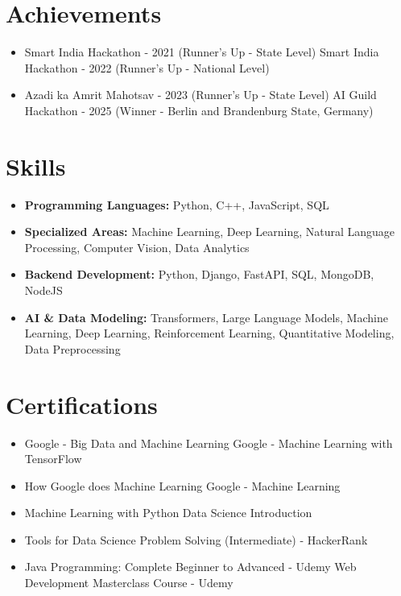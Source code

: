 \documentclass[a4paper,10pt]{article}
\begin{document}
\section*{Achievements}
\begin{itemize}
\item Smart India Hackathon - 2021 (Runner's Up - State Level) \hfill Smart India Hackathon - 2022 (Runner's Up - National Level)
\item Azadi ka Amrit Mahotsav - 2023 (Runner's Up - State Level) \hfill AI Guild Hackathon - 2025 (Winner - Berlin and Brandenburg State, Germany)
\end{itemize}

\section*{Skills}
\begin{itemize}
  \item \textbf{Programming Languages:} Python, C++, JavaScript, SQL
  \item \textbf{Specialized Areas:} Machine Learning, Deep Learning, Natural Language Processing, Computer Vision, Data Analytics
  \item \textbf{Backend Development:} Python, Django, FastAPI, SQL, MongoDB, NodeJS
  \item \textbf{AI \& Data Modeling:} Transformers, Large Language Models, Machine Learning, Deep Learning, Reinforcement Learning, Quantitative Modeling, Data Preprocessing
\end{itemize}

\section*{Certifications}
\begin{itemize}
\item Google - Big Data and Machine Learning \hfill Google - Machine Learning with TensorFlow
\item How Google does Machine Learning \hfill Google - Machine Learning
\item Machine Learning with Python \hfill Data Science Introduction
\item Tools for Data Science \hfill Problem Solving (Intermediate) - HackerRank
\item Java Programming: Complete Beginner to Advanced - Udemy \hfill Web Development Masterclass Course - Udemy
\end{itemize}
\end{document}
